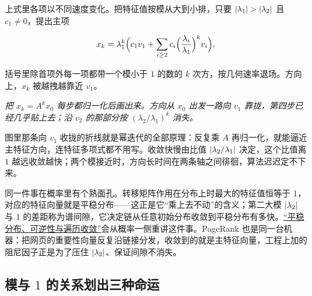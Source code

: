 上式里各项以不同速度变化。把特征值按模从大到小排，只要 \(\abs{\lambda_1}>\abs{\lambda_2}\) 且 \(c_1\neq 0\)，提出主项

\[
x_k=\lambda_1^k\Bigl(c_1v_1+\sum_{i\ge 2}c_i\Bigl(\frac{\lambda_i}{\lambda_1}\Bigr)^{k}v_i\Bigr),
\]

括号里除首项外每一项都带一个模小于 \(1\) 的数的 \(k\) 次方，按几何速率退场。方向上，\(x_k\) 被越拽越靠近 \(v_1\)。

\begin{center}

\emph{把 \(x_k=A^kx_0\) 每步都归一化后画出来。方向从 \(x_0\) 出发一路向 \(v_1\) 靠拢，第四步已经几乎贴上去；沿 \(v_2\) 的那部分按 \((\lambda_2/\lambda_1)^k\) 消失。}
\end{center}

图里那条向 \(v_1\) 收拢的折线就是幂迭代的全部原理：反复乘 \(A\) 再归一化，就能逼近主特征方向，连特征多项式都不用写。收敛快慢由比值 \(\left|\lambda_2/\lambda_1\right|\) 决定，这个比值离 \(1\) 越远收敛越快；两个模接近时，方向长时间在两条轴之间徘徊，算法迟迟定不下来。

同一件事在概率里有个熟面孔。转移矩阵作用在分布上时最大的特征值恒等于 \(1\)，对应的特征向量就是平稳分布——这正是它``乘上去不动''的含义；第二大模 \(\left|\lambda_2\right|\) 与 \(1\) 的差距称为谱间隙，它决定链从任意初始分布收敛到平稳分布有多快。\hyperref[sec:06-Random-Processes/03-Markov-Chains/04]{``平稳分布、可逆性与遍历收敛''}会从概率一侧重讲这件事。PageRank 也是同一台机器：把网页的重要性向量反复沿链接分发，收敛到的就是主特征向量，工程上加的阻尼因子正是为了压住 \(\left|\lambda_2\right|\)、保证间隙不消失。

\subsection{模与 \texorpdfstring{\(1\)}{1} 的关系划出三种命运}

